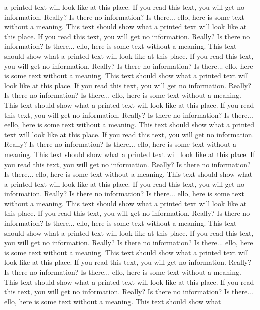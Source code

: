 \documentclass{article}
\begin{document}
\begin{multicols}{3}
 a printed text will look like at this place.
 If you read this text, you will get no information.  Really?  Is there 
 no information?  Is there...
ello, here is some text without a meaning.  This text should show what 
 a printed text will look like at this place.
 If you read this text, you will get no information.  Really?  Is there 
 no information?  Is there...
ello, here is some text without a meaning.  This text should show what 
 a printed text will look like at this place.
 If you read this text, you will get no information.  Really?  Is there 
 no information?  Is there...
ello, here is some text without a meaning.  This text should show what 
 a printed text will look like at this place.
 If you read this text, you will get no information.  Really?  Is there 
 no information?  Is there...
ello, here is some text without a meaning.  This text should show what 
 a printed text will look like at this place.
 If you read this text, you will get no information.  Really?  Is there 
 no information?  Is there...
eello, here is some text without a meaning.  This text should show what 
 a printed text will look like at this place.
 If you read this text, you will get no information.  Really?  Is there 
 no information?  Is there...
ello, here is some text without a meaning.  This text should show what 
 a printed text will look like at this place.
 If you read this text, you will get no information.  Really?  Is there 
 no information?  Is there...
ello, here is some text without a meaning.  This text should show what 
 a printed text will look like at this place.
 If you read this text, you will get no information.  Really?  Is there 
 no information?  Is there...
ello, here is some text without a meaning.  This text should show what 
 a printed text will look like at this place.
 If you read this text, you will get no information.  Really?  Is there 
 no information?  Is there...
ello, here is some text without a meaning.  This text should show what 
 a printed text will look like at this place.
 If you read this text, you will get no information.  Really?  Is there 
 no information?  Is there...
ello, here is some text without a meaning.  This text should show what 
 a printed text will look like at this place.
 If you read this text, you will get no information.  Really?  Is there 
 no information?  Is there...
ello, here is some text without a meaning.  This text should show what 
 a printed text will look like at this place.
 If you read this text, you will get no information.  Really?  Is there 
 no information?  Is there...
ello, here is some text without a meaning.  This text should show what 

\end{multicols}
\end{document}
